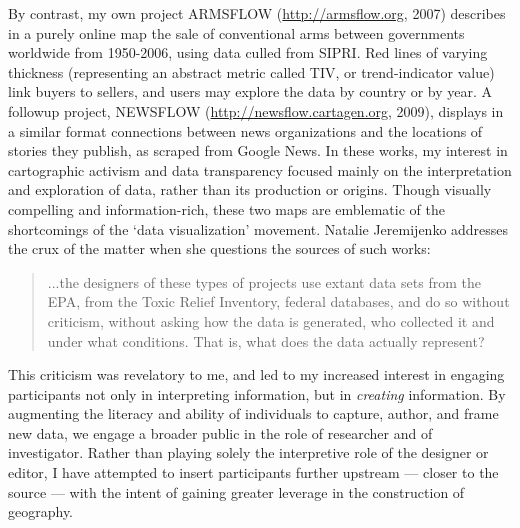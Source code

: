 \documentclass[11pt,oneside,notitlepage]{report}
\begin{document}
{{By contrast, my own project ARMSFLOW (\url{http://armsflow.org}, 2007) describes in a purely online map the sale of conventional arms between governments worldwide from 1950-2006, using data culled from \ac{SIPRI}. Red lines of varying thickness (representing an abstract metric called TIV, or trend-indicator value) link buyers to sellers, and users may explore the data by country or by year. A followup project, NEWSFLOW (\url{http://newsflow.cartagen.org}, 2009), displays in a similar format connections between news organizations and the locations of stories they publish, as scraped from Google News. In these works, my interest in cartographic activism and data transparency focused mainly on the interpretation and exploration of data, rather than its production or origins. Though visually compelling and information-rich, these two maps are emblematic of the shortcomings of the `data visualization' movement. Natalie Jeremijenko addresses the crux of the matter when she questions the sources of such works: 

\begin{quote}
...the designers of these types of projects use extant data sets from the EPA, from the Toxic Relief Inventory, federal databases, and do so without criticism, without asking how the data is generated, who collected it and under what conditions. That is, what does the data actually represent? \cite{jeremijenko2008situated}
\end{quote}

This criticism was revelatory to me, and led to my increased interest in engaging participants not only in interpreting information, but in \emph{creating} information. By augmenting the literacy and ability of individuals to capture, author, and frame new data, we engage a broader public in the role of researcher and of investigator. Rather than playing solely the interpretive role of the designer or editor, I have attempted to insert participants further upstream --- closer to the source --- with the intent of gaining greater leverage in the construction of geography. 


}}
\end{document}
